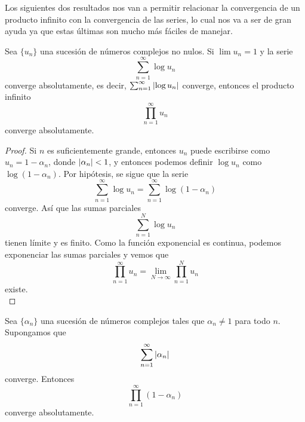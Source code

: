 \medskip

Los siguientes dos resultados nos van a permitir relacionar la convergencia de un producto infinito con la convergencia de las series, lo cual nos va a ser de gran ayuda ya que estas últimas son mucho más fáciles de manejar. \\

\begin{prop}
    Sea $\{u_n\}$ una sucesión de números complejos no nulos. Si $\lim u_n =1$ y la serie
    \begin{equation*}
        \sum_{n=1}^{\infty} \log u_n
    \end{equation*}
    converge absolutamente, es decir, $ \sum_{n=1}^{\infty} \left\lvert\log u_n\right\rvert$ converge, entonces el producto infinito
    \begin{equation*}
        \prod_{n=1}^{\infty} u_n
    \end{equation*}
    converge absolutamente.
\end{prop}

\begin{proof}
    Si $n$ es suficientemente grande, entonces $u_n$ puede escribirse como $u_n = 1 - \alpha_n$, donde $\left\lvert\alpha_n\right\rvert < 1$, y entonces podemos definir $\log{u_n}$ como $\log{(1 - \alpha_n)}$. Por hipótesis, se sigue que la serie
    \begin{equation*}
        \sum_{n=1}^{\infty} \log u_n = \sum_{n=1}^{\infty} \log{(1 - \alpha_n)}
    \end{equation*}
    converge. Así que las sumas parciales
    \begin{equation*}
        \sum_{n=1}^{N} \log u_n
    \end{equation*}
    tienen límite y es finito. Como la función exponencial es continua, podemos exponenciar las sumas parciales y vemos que
    \begin{equation*}
        \prod_{n=1}^{\infty} u_n = \lim_{N \to \infty} \prod_{n=1}^{N} u_n
    \end{equation*}
    existe. \\
\end{proof}

\begin{prop}
    \label{th:convergencia}
    Sea $\{\alpha_n\}$ una sucesión de números complejos tales que $\alpha_n \not = 1$ para todo $n$. Supongamos que
    \begin{equation*}
        \sum_{n=1}^{\infty} \left\lvert\alpha_n\right\rvert
    \end{equation*}
    converge. Entonces
    \begin{equation*}
        \prod_{n=1}^{\infty} (1 - \alpha_n)
    \end{equation*}
    converge absolutamente.
\end{prop}

